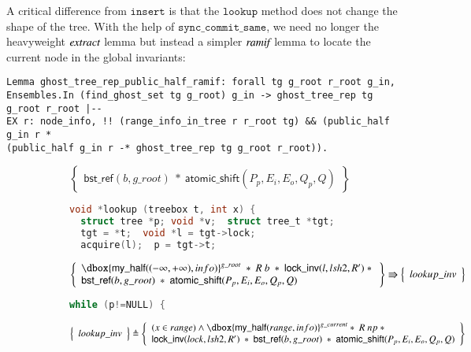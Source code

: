 \documentclass[runningheads]{llncs}
\newcommand\dboxed[1]{\dbox{\ensuremath{#1}}}
\newcommand{\ghost}[2]{\ensuremath{\dboxed{#1}^{#2}}}
\newcommand{\nodeboxrep}{\ensuremath{\mathsf{bst\_ref}}}
\begin{document}
{A critical difference from $\texttt{insert}$ is that the
$\texttt{lookup}$ method does not change the shape of the tree. With the
help of $\texttt{sync\_commit\_same}$, we need no longer the
heavyweight $\emph{extract}$ lemma but instead a simpler
$\emph{ramif}$ lemma to locate the current node in the global
invariants:
\begin{verbatim}
Lemma ghost_tree_rep_public_half_ramif: forall tg g_root r_root g_in,
Ensembles.In (find_ghost_set tg g_root) g_in -> ghost_tree_rep tg g_root r_root |-- 
EX r: node_info, !! (range_info_in_tree r r_root tg) && (public_half g_in r * 
(public_half g_in r -* ghost_tree_rep tg g_root r_root)).
\end{verbatim}

\begin{figure}[htp]
\begin{subfigure}[t]{1\textwidth}
 \[\left\{\begin{array}{l} \nodeboxrep(b,g\_root)\ *\ \mathsf{atomic\_shift}(P_p,E_i,E_o,Q_p,Q)\end{array}\right\}\]
\begin{lstlisting}[language = C,  numbers = none]
void *lookup (treebox t, int x) {
  struct tree *p; void *v;  struct tree_t *tgt;
  tgt = *t;  void *l = tgt->lock;
  acquire(l);  p = tgt->t;
 \end{lstlisting}  
 $$\left\{\begin{array}{l} \ghost{\mathsf{my\_half}((-\infty,+\infty),info)}{g\_root}\ *\ R\ b\ *\ \mathsf{lock\_inv}(l,lsh2,R')\ *\ \\
 \nodeboxrep(b,g\_root)\ *\ \mathsf{atomic\_shift}(P_p,E_i,E_o,Q_p,Q)\end{array}\right\} \Rrightarrow \left\{\begin{array}{l} lookup\_inv \end{array}\right\}$$ 
  \begin{lstlisting}[language = C, numbers = none]
    while (p!=NULL) {
       \end{lstlisting}   
   $$\left\{\begin{array}{l} lookup\_inv \end{array}\right\} \triangleq \left\{\begin{array}{l}(x\in range)\land \ghost{\mathsf{my\_half}(range,info)}{g\_current}*\ R\ np\ *\\\mathsf{lock\_inv}(lock,lsh2,R')\ *\ \nodeboxrep(b,g\_root)\ *\ \mathsf{atomic\_shift}(P_p,E_i,E_o,Q_p,Q)\end{array}\right\}$$
      \begin{lstlisting}[language = C,  numbers = none]

\end{lstlisting}
\end{subfigure}
\end{figure}}
\end{document}

